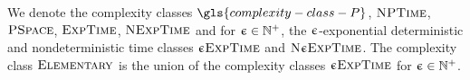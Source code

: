 We denote the complexity classes $\gls{complexity-class-P}$, $\cNP$,
$\cPSpace$, $\cExpTime$, $\cNExpTime$ and for $\nex \in \pNats$, the
$\nex$-exponential deterministic and nondeterministic time classes
$\ceExpTime\nex$ and $\ceNExpTime\nex$.
The complexity class $\cElementary$ is the union of the complexity classes
$\ceExpTime\nex$ for $\nex \in \pNats$.
